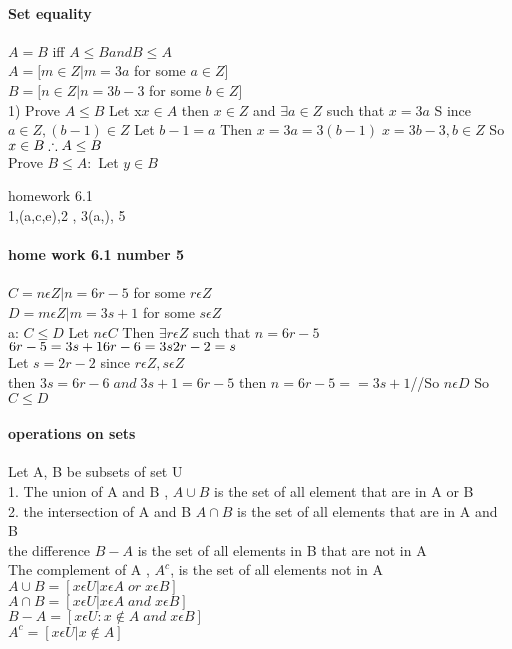 \documentclass[10pt,letterpaper]{report}
\begin{document}
{\paragraph{Set equality} $ A = B $ iff $ A \leq B and B \leq A $ \\ $ A = [ m \in Z | m = 3a $ for some $ a \in Z ] $ \\ $ B = [ n \in Z | n = 3b -3 $ for some $ b  \in Z] $ \\ 1) Prove $ A \leq B $ Let x$ x \in A $ then $ x \in Z $ and $ \exists a \in Z $ such that $ x = 3a $  S ince $ a \in Z , (b - 1 ) \in Z $ Let $ b-1 = a $ Then $ x = 3a = 3 ( b-1) \;x = 3b -3 , b \in Z $ So $ x \in B \\ \therefore A \leq B $ \\ Prove $ B \leq A : $ Let $ y \in B $
\par{homework 6.1 \\ 1,(a,c,e),2 , 3(a,), 5 }
\paragraph{home work 6.1 number 5} $ C = n \epsilon Z | n = 6r-5 $ for some $ r \epsilon Z$ \\$ D = m \epsilon Z | m = 3s+1 $ for some $ s \epsilon Z$ \\ a: $C\leq D$ Let $ n \epsilon C $ Then $ \exists r \epsilon Z $ such that $ n = 6r -5 $ \\ $ 6r -5 = 3 s + 1 \\ 6r-6 = 3s \\2r-2 =s $ \\ Let $ s = 2r-2$ since $ r \epsilon Z,s \epsilon Z $ \\then $ 3s= 6r -6 \; and\;3s + 1 = 6r-5$ then $ n = 6r -5 == 3s+1$//So $ n \epsilon D $ So $ C \leq D$ 
\paragraph{operations on sets} Let A, B be subsets of set U \\ 1. The union of A and B , $ A \cup B $ is the set of all element that are in A or B \\ 2. the intersection of A and B $ A \cap B $ is the set of all elements that are in A and B \\ the difference $ B -A $ is the set of all elements in B that are not in A \\  The complement of A , $ A^c$, is the set of all elements not in A \\ $ A \cup B = [ x \epsilon U | x \epsilon A \; or \; x \epsilon B ]$ \\$ A \cap B = [  x \epsilon U | x \epsilon A \; and \; x \epsilon B ] $ \\ $ B -A = [ x \epsilon U : x \notin A \; and \; x \epsilon B] $ \\ $ A ^c = [ x \epsilon U | x \notin A  ] $ 
}
\end{document}
